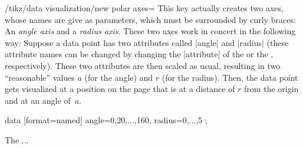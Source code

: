 \begin{key}{/tikz/data visualization/new polar axes=}
  This key actually creates two axes, whose names are give as
  parameters, which must be surrounded by curly braces: An
  \emph{angle axis} and a \emph{radius axis}. These two axes work in
  concert in the following way: Suppose a data point has two
  attributes called |angle| and |radius| (these attribute names can be
  changed by changing the |attribute| of the  or
  the , respectively). These two attributes are
  then scaled as usual, resulting in two ``reasonable'' values $a$
  (for the angle) and $r$ (for the radius). Then, the data point gets
  visualized at a position on the page that is at a distance of $r$
  from the origin and at an angle of~$a$. 
\begin{codeexample}[]
\tikz \datavisualization
    [new polar axes={angle axis}{radius axis},
     radius axis={length=2cm},
     visualize as scatter]
  data [format=named] {
    angle={0,20,...,160}, radius={0,...,5}
  };
\end{codeexample}
  The ... 
\end{key}


\endinput

\subsection{Axis Systems}
\label{section-dv-axis-systems}

\subsubsection{Concepts}

\subsubsection{Usage}

\subsubsection{Reference: Scientific Axis Systems}

